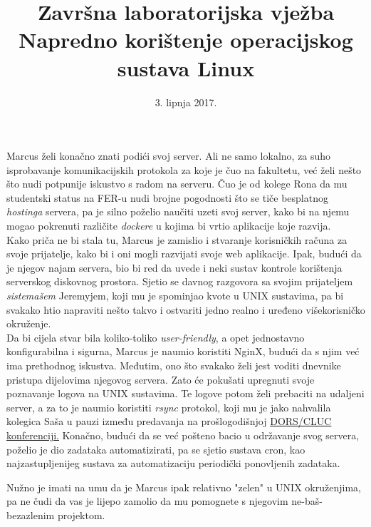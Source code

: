 \documentclass[12pt,a4paper]{article}
\begin{document}
	\title{Završna laboratorijska vježba\\{\large Napredno korištenje operacijskog sustava Linux}}
	\date{\vspace{-5ex} 3. lipnja 2017.}
	\maketitle

	Marcus želi konačno znati podići svoj server. Ali ne samo lokalno, za suho isprobavanje komunikacijskih protokola za koje je čuo na fakultetu, već želi nešto što nudi potpunije iskustvo s radom na serveru. Čuo je od kolege Rona da mu studentski status na FER-u nudi brojne pogodnosti što se tiče besplatnog \textit{hostinga} servera, pa je silno poželio naučiti uzeti svoj server, kako bi na njemu mogao pokrenuti različite \textit{dockere} u kojima bi vrtio aplikacije koje razvija. \\
	Kako priča ne bi stala tu, Marcus je zamislio i stvaranje korisničkih računa za svoje prijatelje, kako bi i oni mogli razvijati svoje web aplikacije. Ipak, budući da je njegov najam servera, bio bi red da uvede i neki sustav kontrole korištenja serverskog diskovnog prostora. Sjetio se davnog razgovora sa svojim prijateljem \textit{sistemašem} Jeremyjem, koji mu je spominjao kvote u UNIX sustavima, pa bi svakako htio napraviti nešto takvo i ostvariti jedno realno i uređeno višekorisničko okruženje. \\
	Da bi cijela stvar bila koliko-toliko \textit{user-friendly}, a opet jednostavno konfigurabilna i sigurna, Marcus je naumio koristiti NginX, budući da s njim već ima prethodnog iskustva. Međutim, ono što svakako želi jest voditi dnevnike pristupa dijelovima njegovog servera. Zato će pokušati upregnuti svoje poznavanje logova na UNIX sustavima. Te logove potom želi prebaciti na udaljeni server, a za to je naumio koristiti \textit{rsync} protokol, koji mu je jako nahvalila kolegica Saša u pauzi između predavanja na prošlogodišnjoj \href{http://www.dorscluc.org/}{DORS/CLUC konferenciji.}
	Konačno, budući da se već pošteno bacio u održavanje svog servera, poželio je dio zadataka automatizirati, pa se sjetio sustava cron, kao najzastupljenijeg sustava za automatizaciju periodički ponovljenih zadataka. \\

	\par Nužno je imati na umu da je Marcus ipak relativno "zelen" u UNIX okruženjima, pa ne čudi da vas je lijepo zamolio da mu pomognete s njegovim ne-baš-bezazlenim projektom.
\end{document}
